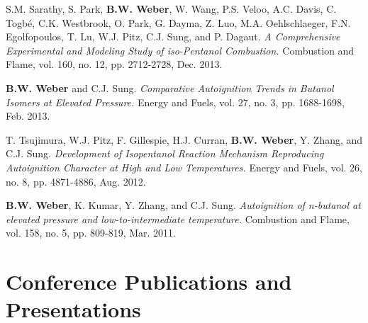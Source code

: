 \begin{bibsection}
\item[] S.M. Sarathy, S. Park, \textbf{B.W. Weber}, W. Wang,
        P.S. Veloo, A.C. Davis, C. Togbé, C.K. Westbrook, O. Park,
        G. Dayma, Z. Luo, M.A. Oehlschlaeger, F.N. Egolfopoulos,
        T. Lu, W.J. Pitz, C.J. Sung, and P. Dagaut. \textit{A 
        Comprehensive Experimental and Modeling Study of iso-Pentanol 
        Combustion.} Combustion and Flame, vol. 160, no. 12, pp. 
        2712-2728, Dec. 2013. 
        
\item[] \textbf{B.W. Weber} and C.J. Sung. \textit{Comparative
        Autoignition Trends in Butanol Isomers at Elevated Pressure.}
        Energy and Fuels, vol. 27, no. 3, pp. 1688-1698, Feb. 2013. \\
        
\item[] T. Tsujimura, W.J. Pitz, F. Gillespie, H.J. Curran,
        \textbf{B.W. Weber}, Y. Zhang, and C.J. Sung.
        \textit{Development of Isopentanol Reaction Mechanism
        Reproducing Autoignition Character at High and Low
        Temperatures.} Energy and Fuels, vol. 26, no. 8, pp. 4871-4886,
        Aug. 2012. 
        
\item[] \textbf{B.W. Weber}, K. Kumar, Y. Zhang, and C.J. Sung.
        \textit{Autoignition of n-butanol at elevated pressure and
        low-to-intermediate temperature.} Combustion and Flame,
        vol. 158, no. 5, pp. 809-819, Mar. 2011.
\end{bibsection}


\section{Conference Publications and Presentations}


